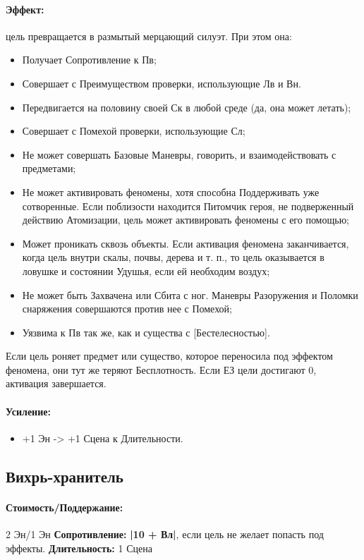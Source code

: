 \paragraph{Эффект: }цель превращается в размытый мерцающий силуэт. При этом она: 
\begin{itemize} 
\item Получает Сопротивление к Пв; 
\item Совершает с Преимуществом проверки, использующие Лв и Вн. 
\item Передвигается на половину своей Ск в любой среде (да, она может летать); 
\item Совершает с Помехой проверки, использующие Сл; 
\item Не может совершать Базовые Маневры, говорить, и взаимодействовать с предметами; 
\item Не может активировать феномены, хотя способна Поддерживать уже сотворенные. Если поблизости находится Питомчик героя, не подверженный действию Атомизации, цель может  активировать феномены с его помощью; 
\item Может проникать сквозь объекты. Если активация феномена заканчивается, когда цель внутри скалы, почвы, дерева и т. п., то цель оказывается в ловушке и состоянии Удушья, если ей необходим воздух; 
\item Не может быть Захвачена или Сбита с ног. Маневры Разоружения и Поломки снаряжения совершаются против нее с Помехой; 
\item Уязвима к Пв так же, как и существа с [Бестелесностью]. 
\end{itemize} Если цель роняет предмет или существо, которое переносила под эффектом феномена, они тут же теряют Бесплотность. Если ЕЗ цели достигают 0, активация завершается.
\paragraph{Усиление:}
\begin{itemize}
\item+1 Эн -> +1 Сцена к Длительности.
\end{itemize}
\subsection{Вихрь-хранитель}
\paragraph{} 
\textit{
\tbd}
\paragraph{Стоимость/Поддержание: }2 Эн/1 Эн
\newline
\textbf{Сопротивление: }
\textbf{|10 + Вл|}, если цель не желает попасть под эффекты.
\newline 
\textbf{Длительность: }1 Сцена
